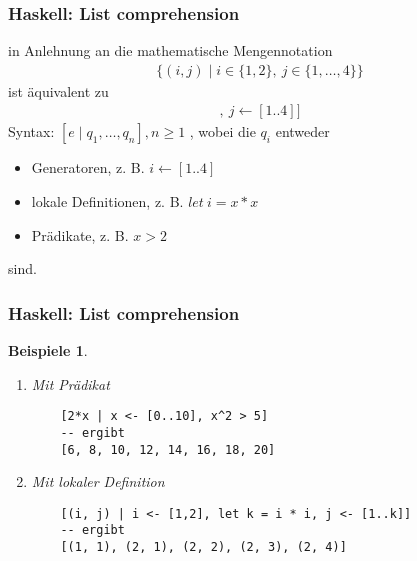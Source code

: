 \documentclass{beamer}
\newtheorem{examplesg}{Beispiele}
\begin{document}
\begin{frame}[fragile]
\frametitle{Haskell: List comprehension}
in Anlehnung an die mathematische Mengennotation
\begin{gather*}
    \{(i,j) \mid i \in \{1, 2\},\: j \in \{1, \dots, 4\}\}
\end{gather*}
ist äquivalent zu
\begin{gather*}
    [(i, j) \mid i \leftarrow [1,2],\: j \leftarrow [1..4]]
\end{gather*}
Syntax: $[e \mid q_1, \dots, q_n], n \geq 1$ , wobei die $q_i$ entweder
\begin{itemize}
    \item Generatoren, z. B. $i \leftarrow \left[1..4\right]$
    \item lokale Definitionen, z. B. $let\:i = x * x$
    \item Prädikate, z. B. $x > 2$
\end{itemize}
sind.
\end{frame}

\begin{frame}[t, fragile]
\frametitle{Haskell: List comprehension}
\begin{examplesg}
\begin{enumerate}
    \item Mit Prädikat
    \begin{lstlisting}
    [2*x | x <- [0..10], x^2 > 5]
    -- ergibt
    [6, 8, 10, 12, 14, 16, 18, 20]
    \end{lstlisting}
    \item Mit lokaler Definition
    \begin{lstlisting}
    [(i, j) | i <- [1,2], let k = i * i, j <- [1..k]]
    -- ergibt
    [(1, 1), (2, 1), (2, 2), (2, 3), (2, 4)]
\end{lstlisting}
\end{enumerate}
\end{examplesg}
\end{frame}
\end{document}
